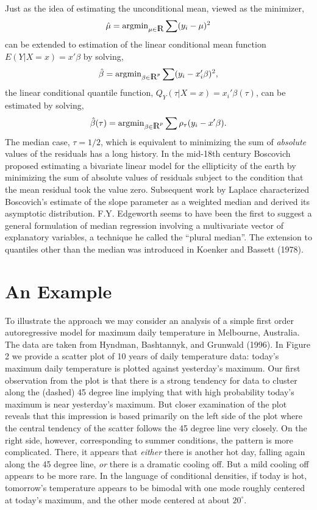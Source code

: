 \documentclass{amsart}
\def\RR{\hbox{\raise.4ex\hbox{$\scriptstyle{|}$}\hskip-1.85pt R}}
\begin{document}
Just as the idea of estimating the unconditional mean, 
viewed as the minimizer,
\[
\hat \mu = \mathrm{argmin}_{\mu \in \RR} \sum (y_i - \mu)^2
\]
can be extended
to estimation of the linear conditional mean function $E(Y|X=x)=x' \beta$
by solving,
\[
\hat \beta = \mathrm{argmin}_{\beta \in \RR^p} \sum (y_i - x_i' \beta)^2 ,
\]
the linear conditional quantile function, $Q_Y(\tau | X=x) = x_i' \beta (\tau)$,
can be estimated by solving,
\[
\hat \beta (\tau) = 
\mathrm{argmin}_{\beta \in \RR^p} \sum \rho_\tau (y_i - x' \beta).
\]
The median case, $\tau = 1/2$, which is equivalent to minimizing the
sum of {\it absolute} values of the residuals 
has a long history. 
In the mid-18th century Boscovich proposed estimating a bivariate linear 
model for the ellipticity of the earth by minimizing the sum of absolute values
of residuals subject to the condition that the mean residual took the value
zero. Subsequent work by Laplace characterized Boscovich's estimate of
the slope parameter as a weighted median and derived its asymptotic
distribution.
F.Y. Edgeworth seems to have been the first to suggest a
general formulation of median regression involving a multivariate vector 
of explanatory variables, a technique he called the ``plural median''.
The extension to quantiles other than the median was introduced in
Koenker and Bassett (1978).

\section{An Example}

To illustrate the approach we may consider an analysis of a simple first order
autoregressive  model for maximum daily temperature in Melbourne, Australia.
The data are taken from Hyndman, Bashtannyk, and Grunwald (1996). 
In Figure 2 we provide a scatter plot of 10 years
of daily temperature data:  today's maximum daily temperature is plotted
against yesterday's maximum.  Our first observation from the plot is that there 
is a strong tendency for data to cluster along the (dashed) 45 degree line 
implying that with high probability today's 
maximum is near yesterday's maximum.  But closer examination of the
plot reveals that this impression is based primarily on the left side of the
plot where the central tendency of the scatter follows the 45 degree line
very closely.  On the right side, however, corresponding to summer conditions,
the pattern is more complicated.  There, it appears that {\it either}
there is another hot day, falling again along the 45 degree line, {\it or}
there is a dramatic cooling off.  But a mild cooling off appears to be more
rare.  In the language of conditional densities, if today is hot, tomorrow's
temperature appears to be bimodal with one mode roughly centered at today's
maximum, and the other mode centered at about $20^\circ$.
 
\end{document}
